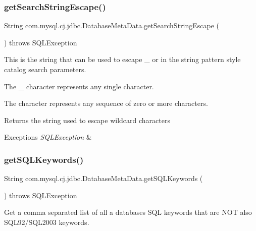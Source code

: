 \subsubsection{\texorpdfstring{get\+Search\+String\+Escape()}{getSearchStringEscape()}}
{\footnotesize\ttfamily String com.\+mysql.\+cj.\+jdbc.\+Database\+Meta\+Data.\+get\+Search\+String\+Escape (\begin{DoxyParamCaption}{ }\end{DoxyParamCaption}) throws S\+Q\+L\+Exception}

This is the string that can be used to escape \textquotesingle{}\+\_\+\textquotesingle{} or \textquotesingle{}\textquotesingle{} in the string pattern style catalog search parameters. 

The \textquotesingle{}\+\_\+\textquotesingle{} character represents any single character. 

The \textquotesingle{}\textquotesingle{} character represents any sequence of zero or more characters. 

\begin{DoxyReturn}{Returns}
the string used to escape wildcard characters 
\end{DoxyReturn}

\begin{DoxyExceptions}{Exceptions}
{\em S\+Q\+L\+Exception} & \\
\hline
\end{DoxyExceptions}
\mbox{\label{classcom_1_1mysql_1_1cj_1_1jdbc_1_1_database_meta_data_aab2c54d10e91a54ade1420ba242372fd}} 
\subsubsection{\texorpdfstring{get\+S\+Q\+L\+Keywords()}{getSQLKeywords()}}
{\footnotesize\ttfamily String com.\+mysql.\+cj.\+jdbc.\+Database\+Meta\+Data.\+get\+S\+Q\+L\+Keywords (\begin{DoxyParamCaption}{ }\end{DoxyParamCaption}) throws S\+Q\+L\+Exception}

Get a comma separated list of all a database\textquotesingle{}s S\+QL keywords that are N\+OT also S\+Q\+L92/\+S\+Q\+L2003 keywords.


